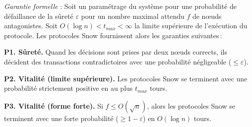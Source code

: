 \documentclass[letterpaper,twocolumn,10pt]{article}
\newcommand{\Oh}[1]{O(#1)}
\theoremstyle{definition}
\begin{document}
\emph{Garantie formelle} : Soit un paramétrage du système pour une probabilité de défaillance de la sûreté $\varepsilon$ pour un nombre maximal attendu $f$ de nœuds antagonistes. Soit $\Oh{\log n} < t_{max} < \infty$ la limite supérieure de l'exécution du protocole. Les protocoles Snow fournissent alors les garanties suivantes\,:
\begin{compactitem}

     \item \textbf{P1. Sûreté.} Quand les décisions sont prises par deux nœuds corrects, ils décident des transactions contradictoires avec une probabilité négligeable ($\leq \varepsilon$).
     \item \textbf{P2. Vitalité (limite supérieure).} Les protocoles Snow se terminent avec une probabilité strictement positive en au plus $t_{max}$ tours.
     \item \textbf{P3. Vitalité (forme forte).} Si $f \leq \Oh{\sqrt{n}}$, alors les protocoles Snow se terminent avec une forte probabilité ($\geq 1 - \varepsilon$) en $\Oh{\log{n}}$ tours.
\end{compactitem}
\end{document}
